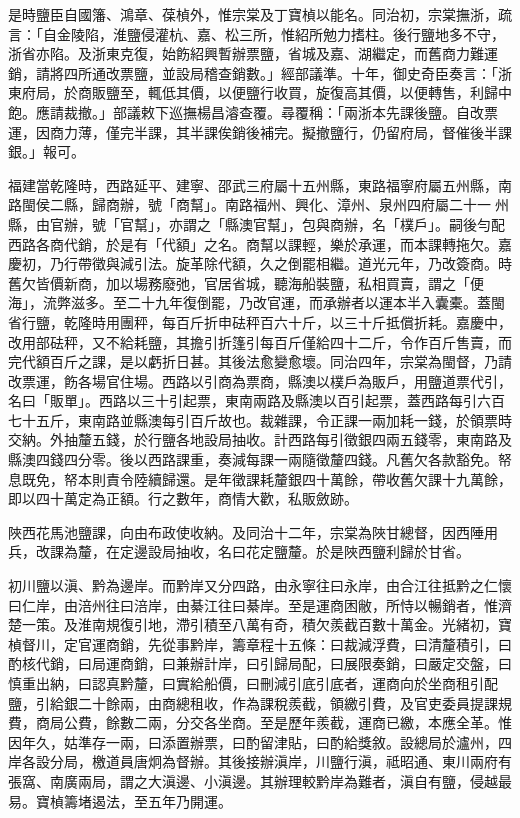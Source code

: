 \begin{pinyinscope}
是時鹽臣自國籓、鴻章、葆楨外，惟宗棠及丁寶楨以能名。同治初，宗棠撫浙，疏言：「自金陵陷，淮鹽侵灌杭、嘉、松三所，惟紹所勉力搘柱。後行鹽地多不守，浙省亦陷。及浙東克復，始飭紹興暫辦票鹽，省城及嘉、湖繼定，而舊商力難運銷，請將四所通改票鹽，並設局稽查銷數。」經部議準。十年，御史奇臣奏言：「浙東府局，於商販鹽至，輒低其價，以便鹽行收買，旋復高其價，以便轉售，利歸中飽。應請裁撤。」部議敕下巡撫楊昌濬查覆。尋覆稱：「兩浙本先課後鹽。自改票運，因商力薄，僅完半課，其半課俟銷後補完。擬撤鹽行，仍留府局，督催後半課銀。」報可。

福建當乾隆時，西路延平、建寧、邵武三府屬十五州縣，東路福寧府屬五州縣，南路閩侯二縣，歸商辦，號「商幫」。南路福州、興化、漳州、泉州四府屬二十一州縣，由官辦，號「官幫」，亦謂之「縣澳官幫」，包與商辦，名「樸戶」。嗣後勻配西路各商代銷，於是有「代額」之名。商幫以課輕，樂於承運，而本課轉拖欠。嘉慶初，乃行帶徵與減引法。旋革除代額，久之倒罷相繼。道光元年，乃改簽商。時舊欠皆價新商，加以場務廢弛，官居省城，聽海船裝鹽，私相買賣，謂之「便海」，流弊滋多。至二十九年復倒罷，乃改官運，而承辦者以運本半入囊橐。蓋閩省行鹽，乾隆時用團秤，每百斤折申砝秤百六十斤，以三十斤抵償折耗。嘉慶中，改用部砝秤，又不給耗鹽，其擔引折篷引每百斤僅給四十二斤，令作百斤售賣，而完代額百斤之課，是以虧折日甚。其後法愈變愈壞。同治四年，宗棠為閩督，乃請改票運，飭各場官住場。西路以引商為票商，縣澳以樸戶為販戶，用鹽道票代引，名曰「販單」。西路以三十引起票，東南兩路及縣澳以百引起票，蓋西路每引六百七十五斤，東南路並縣澳每引百斤故也。裁雜課，令正課一兩加耗一錢，於領票時交納。外抽釐五錢，於行鹽各地設局抽收。計西路每引徵銀四兩五錢零，東南路及縣澳四錢四分零。後以西路課重，奏減每課一兩隨徵釐四錢。凡舊欠各款豁免。帑息既免，帑本則責令陸續歸還。是年徵課耗釐銀四十萬餘，帶收舊欠課十九萬餘，即以四十萬定為正額。行之數年，商情大歡，私販斂跡。

陜西花馬池鹽課，向由布政使收納。及同治十二年，宗棠為陜甘總督，因西陲用兵，改課為釐，在定邊設局抽收，名曰花定鹽釐。於是陜西鹽利歸於甘省。

初川鹽以滇、黔為邊岸。而黔岸又分四路，由永寧往曰永岸，由合江往抵黔之仁懷曰仁岸，由涪州往曰涪岸，由綦江往曰綦岸。至是運商困敝，所恃以暢銷者，惟濟楚一策。及淮南規復引地，滯引積至八萬有奇，積欠羨截百數十萬金。光緒初，寶楨督川，定官運商銷，先從事黔岸，籌章程十五條：曰裁減浮費，曰清釐積引，曰酌核代銷，曰局運商銷，曰兼辦計岸，曰引歸局配，曰展限奏銷，曰嚴定交盤，曰慎重出納，曰認真黔釐，曰實給船價，曰刪減引底引底者，運商向於坐商租引配鹽，引給銀二十餘兩，由商總租收，作為課稅羨截，領繳引費，及官吏委員提課規費，商局公費，餘數二兩，分交各坐商。至是歷年羨截，運商已繳，本應全革。惟因年久，姑準存一兩，曰添置辦票，曰酌留津貼，曰酌給獎敘。設總局於瀘州，四岸各設分局，檄道員唐炯為督辦。其後接辦滇岸，川鹽行滇，祗昭通、東川兩府有張窩、南廣兩局，謂之大滇邊、小滇邊。其辦理較黔岸為難者，滇自有鹽，侵越最易。寶楨籌堵遏法，至五年乃開運。


\end{pinyinscope}
